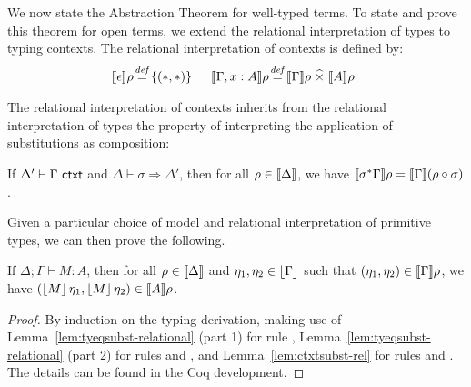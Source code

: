 We now state the Abstraction Theorem for well-typed terms. To state
and prove this theorem for open terms, we extend the
relational interpretation of types to typing contexts. The relational
interpretation of contexts is defined by: %
\begin{displaymath}
  \begin{array}{@{}l@{\hspace{0.1em}\isDefinedAs\hspace{0.1em}}l@{\hspace{1.5em}}l@{\hspace{0.1em}\isDefinedAs\hspace{0.1em}}l}
    \rsem{\epsilon} {\rho} & \{(*,*)\} &
    \rsem{\Gamma, x : A} {\rho} & \rsem{\Gamma} \rho \relTimes \rsem{A} \rho
  \end{array}
\end{displaymath}

The relational interpretation of contexts inherits from the relational
interpretation of types the property of interpreting the application
of substitutions as composition:
\begin{lemma}\label{lem:ctxtsubst-rel}
  If $\Delta' \vdash \Gamma \textup{\textsf{ ctxt}}$ and $\Delta \vdash \sigma
  \Rightarrow \Delta'$, then for all $\rho \in \llbracket \Delta \rrbracket$,
we have 
  $\llbracket \sigma^*\Gamma \rrbracket \rho =
  \llbracket \Gamma \rrbracket(\rho \circ \sigma)$.
\end{lemma}

Given a particular choice of model and relational interpretation of
primitive types, we can then prove the following.
\begin{theorem}[Abstraction]\label{thm:abstraction}
  If $\Delta; \Gamma \vdash M :
  A$, then for all $\rho \in \llbracket \Delta \rrbracket$ and $\eta_1, \eta_2
  \in \left\lfloor \Gamma \right\rfloor$ such that $(\eta_1, \eta_2) \in
  \llbracket \Gamma \rrbracket \rho$, we have $(\left\lfloor{M}\right\rfloor\eta_1,
  \left\lfloor{M}\right\rfloor\eta_2) \in \llbracket A \rrbracket \rho$.
\end{theorem}
\begin{proof}
By induction on the typing derivation, making use of
Lemma~\ref{lem:tyeqsubst-relational} (part 1) for rule ,
Lemma~\ref{lem:tyeqsubst-relational} (part 2) for rules  and ,
and Lemma~\ref{lem:ctxtsubst-rel} for rules  and . 
The details can be found in the Coq development.
\end{proof}

